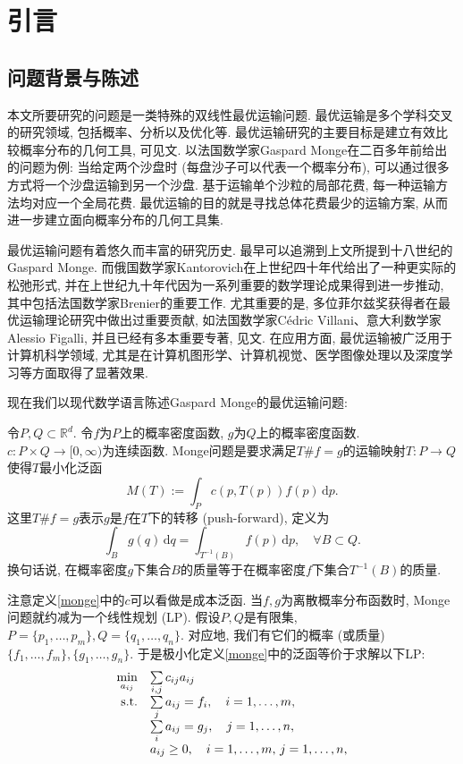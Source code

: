 \section{引言}\label{introduction}
\subsection{问题背景与陈述}
本文所要研究的问题是一类特殊的双线性最优运输问题. 最优运输是多个学科交叉的研究领域, 包括概率、分析以及优化等. 最优运输研究的主要目标是建立有效比较概率分布的几何工具, 可见文\cite{Gu2017}. 以法国数学家Gaspard Monge在二百多年前给出的问题为例: 当给定两个沙盘时 (每盘沙子可以代表一个概率分布), 可以通过很多方式将一个沙盘运输到另一个沙盘. 基于运输单个沙粒的局部花费, 每一种运输方法均对应一个全局花费. 最优运输的目的就是寻找总体花费最少的运输方案, 从而进一步建立面向概率分布的几何工具集. 
\par 最优运输问题有着悠久而丰富的研究历史. 最早可以追溯到上文所提到十八世纪的Gaspard Monge. 而俄国数学家Kantorovich在上世纪四十年代给出了一种更实际的松弛形式, 并在上世纪九十年代因为一系列重要的数学理论成果得到进一步推动, 其中包括法国数学家Brenier的重要工作. 尤其重要的是, 多位菲尔兹奖获得者在最优运输理论研究中做出过重要贡献, 如法国数学家C\'edric Villani、意大利数学家Alessio Figalli, 并且已经有多本重要专著, 见文\cite{Villani2003Topics,Villani2008Optimal,Santambrogio2015Optimal,Peyre2019Computational}. 在应用方面, 最优运输被广泛用于计算机科学领域, 尤其是在计算机图形学、计算机视觉、医学图像处理以及深度学习等方面取得了显著效果.
\par 现在我们以现代数学语言陈述Gaspard Monge的最优运输问题:
\begin{dfn}[Monge问题]\label{monge}
	令$P,Q\subset\mathbb{R}^d$. 令$f$为$P$上的概率密度函数, $g$为$Q$上的概率密度函数. $c:P\times Q\to[0,\infty)$为连续函数. Monge问题是要求满足$T\#f=g$的运输映射$T:P\to Q$使得$T$最小化泛函
	$$M(T):=\int_Pc(p,T(p))f(p)\,\mathrm{d}p.$$
	这里$T\#f=g$表示$g$是$f$在$T$下的转移 (push-forward), 定义为
	$$\int_Bg(q)\,\mathrm{d}q=\int_{T^{-1}(B)}f(p)\,\mathrm{d}p,\quad\forall B\subset Q.$$换句话说, 在概率密度$g$下集合$B$的质量等于在概率密度$f$下集合$T^{-1}(B)$的质量.
\end{dfn}
注意定义\ref{monge}中的$c$可以看做是成本泛函. 当$f,g$为离散概率分布函数时, Monge问题就约减为一个线性规划 (LP). 假设$P,Q$是有限集, $P=\{p_1,\ldots,p_m\},Q=\{q_1,\ldots,q_n\}$. 对应地, 我们有它们的概率 (或质量)$\{f_1,\ldots,f_m\},\{g_1,\ldots,g_n\}$. 于是极小化定义\ref{monge}中的泛函等价于求解以下LP:
\begin{equation}
	\begin{array}{rl}
		\min\limits_{a_{ij}} & \sum\limits_{i,j}c_{ij}a_{ij}\\
		\mathrm{s.t.} & \sum\limits_{j}a_{ij}=f_i,\quad i=1,\ldots,m,\\
		&\sum\limits_ia_{ij}=g_j,\quad j=1,\ldots,n,\\
		&a_{ij}\ge0,\quad i=1,\ldots,m,\,j=1,\ldots,n,
	\end{array}
	\label{monge LP}
\end{equation}
